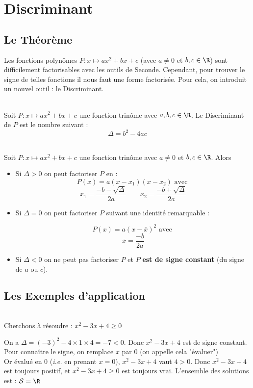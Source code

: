 \documentclass[12pt,fleqn]{report} %
\begin{document}
\section{Discriminant}\label{Discriminant ToolBox}
\subsection{Le Théorème}

Les fonctions polynômes $P : x \mapsto ax^2 + b x + c$ (avec $a\neq 0$ et $b,c \in \R$) sont difficilement factorisables avec les outils de Seconde. Cependant, pour trouver le signe de telles fonctions il nous faut une forme factorisée. Pour cela, on introduit un nouvel outil : le Discriminant.

\begin{definition}\text{ }\\
	Soit $P : x \mapsto a x^2 + bx + c$ une fonction trinôme avec $a,b,c \in \R$.
	Le Discriminant de $P$ est le nombre suivant : \[
	\Delta = b^2 - 4ac
	\]
\end{definition}


\begin{theorem}\label{Théorème Facto Discriminant}\text{ }\\
	Soit $P : x \mapsto a x^2 + bx + c$ une fonction trinôme avec $a\neq 0$ et $b,c \in \R$.
	Alors \begin{itemize}
		\item Si $\Delta >0$ on peut factoriser $P$ en : \[
		P(x) = a (x - x_1)(x - x_2) \text{ avec }
		\]
		\[
		x_1 = \frac{-b - \sqrt{\Delta}}{2a} \qquad x_2 = \frac{-b + \sqrt{\Delta}}{2a}
		\]
		
		\item Si $\Delta = 0$ on peut factoriser $P$ suivant une identité remarquable : 
		
		\[
		P(x) = a\left( x - \overline{x} \right)^2 \text{ avec }
		\]
		\[
		\overline{x} = \frac{-b}{2a}
		\]
		\item Si $\Delta <0$ on ne peut pas factoriser $P$ et $P$ \textbf{est de signe constant} (du signe de $a$ ou $c$).
	\end{itemize}
\end{theorem}
\preuveadmise{}
\subsection{Les Exemples d'application}
\begin{example}\label{Exemple Trino Ineq Discr négatif}\text{ }\\
	Cherchons à résoudre : $ x^2 -3x + 4 \geq 0$
	
	On a $\Delta = (-3)^2 - 4\times 1 \times 4 = -7 <0$. Donc $x^2 -3x + 4$ est de signe constant. Pour connaître le signe, on remplace $x$ par 0 (on appelle cela "évaluer")\\
	Or évalué en 0 (\emph{i.e.} en prenant $x = 0$), $x^2 -3x + 4$ vaut $4>0$. Donc $x^2 -3x + 4$ est toujours positif, et $x^2 -3x + 4 \geq 0 \text{ est toujours vrai.}$
	L'ensemble des solutions est : $\mathcal{S} = \R$
\end{example}
\end{document}
